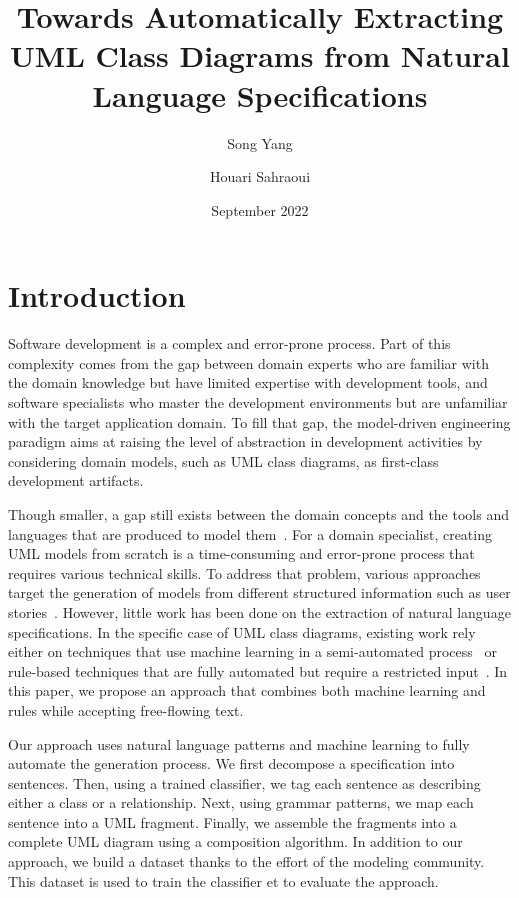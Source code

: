 \documentclass[sigconf]{acmart}
\title{Towards Automatically Extracting UML Class Diagrams from Natural Language Specifications}
\author{Song Yang}
\affiliation{\institution{Université de Montréal}
  \city{Montreal}
  \country{Canada}}
\author{Houari Sahraoui}
\affiliation{\institution{Université de Montréal}
  \city{Montreal}
  \country{Canada}}
\date{September 2022}
\begin{document}
\maketitle

\section{Introduction}
Software development is a complex and error-prone process. Part of this complexity comes from the gap between domain experts who are familiar with the domain knowledge but have limited expertise with development tools, and software specialists who master the development environments but are unfamiliar with the target application domain. To fill that gap, the model-driven engineering paradigm aims at raising the level of abstraction in development activities by considering domain models, such as UML class diagrams, as first-class development artifacts.

Though smaller, a gap still exists between the domain concepts and the tools and languages that are produced to model them~\cite{mussbacher2020opportunities}. For a domain specialist, creating UML models from scratch is a time-consuming and error-prone process that requires various technical skills. To address that problem, various approaches target the generation of models from different structured information such as user stories~\cite{elallaoui2015automatic}. However, little work has been done on the extraction of natural language specifications. In the specific case of UML class diagrams, existing work rely either on techniques that use machine learning in a semi-automated process~\cite{Saini:2022} or rule-based techniques that are fully automated but require a restricted input~\cite{Abdelnabi:2020generating, More:2012}. In this paper, we propose an approach that combines both machine learning and rules while accepting free-flowing text.

Our approach uses natural language patterns and machine learning to fully automate the generation process. We first decompose a specification into sentences. Then, using a trained classifier, we tag each sentence as describing either a class or a relationship. Next, using grammar patterns, we map each sentence into a UML fragment. Finally, we assemble the fragments into a complete UML diagram using a composition algorithm. In addition to our approach, we build a dataset thanks to the effort of the modeling community. This dataset is used to train the classifier et to evaluate the approach.
\end{document}
